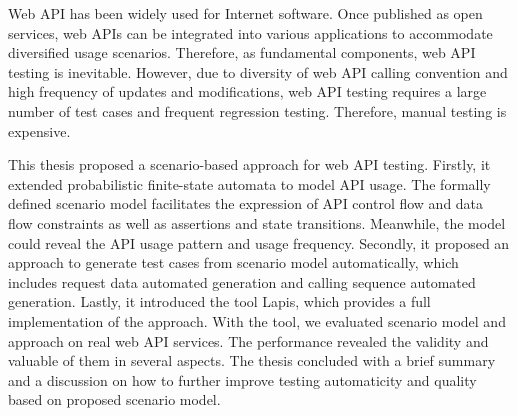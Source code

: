 
\begin{eabstract}
Web API has been widely used for Internet software. Once published as open services, web APIs can be integrated into various applications to accommodate diversified usage scenarios. Therefore, as fundamental components, web API testing is inevitable. However, due to diversity of web API calling convention and high frequency of updates and modifications, web API testing requires a large number of test cases and frequent regression testing. Therefore, manual testing is expensive.

This thesis proposed a scenario-based approach for web API testing. Firstly, it extended probabilistic finite-state automata to model API usage. The formally defined scenario model facilitates the expression of API control flow and data flow constraints as well as assertions and state transitions. Meanwhile, the model could reveal the API usage pattern and usage frequency. Secondly, it proposed an approach to generate test cases from scenario model automatically, which includes request data automated generation and calling sequence automated generation. Lastly, it introduced the tool Lapis, which provides a full implementation of the approach. With the tool, we evaluated scenario model and approach on real web API services. The performance revealed the validity and valuable of them in several aspects. The thesis concluded with a brief summary and a discussion on how to further improve testing automaticity and quality based on proposed scenario model.
\end{eabstract}

